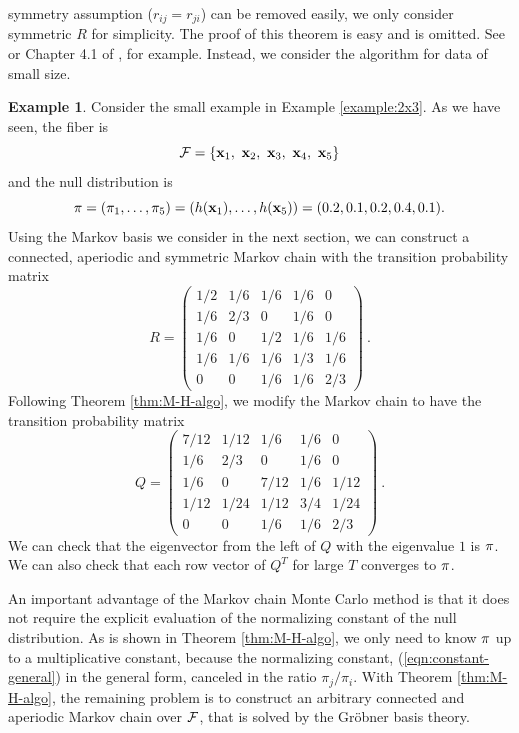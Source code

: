 \documentclass[12pt]{article}
\theoremstyle{definition}
\newtheorem{Example}[Theorem]{Example}
\def\Bx{{\bf x}}
\def\Bpi{{\bf \pi}}
\begin{document}
symmetry assumption ($r_{ij} = r_{ji}$) can be removed easily, we
only consider symmetric $R$ for simplicity. The proof of this theorem is
easy and is omitted. See \cite{Hastings-1970} or Chapter 4.1 of
\cite{dojo-en}, for example. Instead, we consider the algorithm for
data of small size.
\begin{Example}
\label{example:2x3-cont}
Consider the small example in Example \ref{example:2x3}. As we have
 seen, the fiber is
\[
 {\cal F} = \{\Bx_1,\ \Bx_2,\ \Bx_3,\ \Bx_4,\ \Bx_5\}
\]
and the null distribution is 
\[
 \Bpi = (\pi_1,\ldots,\pi_5) = (h(\Bx_1),\ldots,h(\Bx_5)) = (0.2, 0.1,
 0.2, 0.4, 0.1).
\]
Using the Markov basis we consider in the next section, we can construct
 a connected, aperiodic and symmetric Markov chain with the 
transition
 probability matrix
\begin{equation}
 R = \left(\begin{array}{ccccc}
1/2 & 1/6 & 1/6 & 1/6 & 0\\
1/6 & 2/3 & 0 & 1/6 & 0\\
1/6 & 0 & 1/2 & 1/6 & 1/6\\
1/6 & 1/6 & 1/6 & 1/3 & 1/6\\
0 & 0 & 1/6 & 1/6 & 2/3
\end{array}
\right)\ .
\label{eqn:R-in-example} 
\end{equation}
Following Theorem \ref{thm:M-H-algo}, 
we modify the Markov chain to
 have the transition
 probability matrix
\[
Q = \left(\begin{array}{ccccc}
7/12 & 1/12 & 1/6 & 1/6 & 0\\
1/6 & 2/3 & 0 & 1/6 & 0\\
1/6 & 0 & 7/12 & 1/6 & 1/12\\
1/12 & 1/24 & 1/12 & 3/4 & 1/24\\
0 & 0 & 1/6 & 1/6 & 2/3
\end{array}
\right)\ .
\]
We can check that the eigenvector from the left of $Q$ with the
 eigenvalue $1$ is $\Bpi$. We can also check that each row vector of
 $Q^T$ for large $T$ converges to $\Bpi$.

\end{Example}
An important advantage of the Markov chain Monte Carlo method is that it
does not require the explicit evaluation of the normalizing constant of
the null distribution.
As is shown in Theorem \ref{thm:M-H-algo}, we only need to know
$\Bpi$ up to a multiplicative constant, because the normalizing
constant, (\ref{eqn:constant-general}) in the general form, canceled in
the ratio $\pi_j/\pi_i$. With Theorem \ref{thm:M-H-algo}, the remaining
problem is to construct an arbitrary connected and aperiodic Markov
chain over ${\cal F}$, that is solved by the Gr\"obner basis theory.
\end{document}
